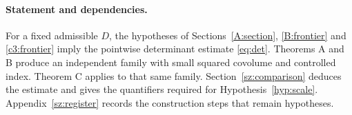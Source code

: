 \paragraph{Statement and dependencies.}
For a fixed admissible $D$, the hypotheses of
Sections~\ref{A:section}, \ref{B:frontier} and \ref{c3:frontier}
imply the pointwise determinant estimate \eqref{eq:det}.
Theorems A and B produce an independent family with small squared
covolume and controlled index. Theorem C applies to that same family.
Section~\ref{sz:comparison} deduces the estimate and gives the
quantifiers required for Hypothesis~\ref{hyp:scale}.
Appendix~\ref{sz:register} records the construction steps that
remain hypotheses.
